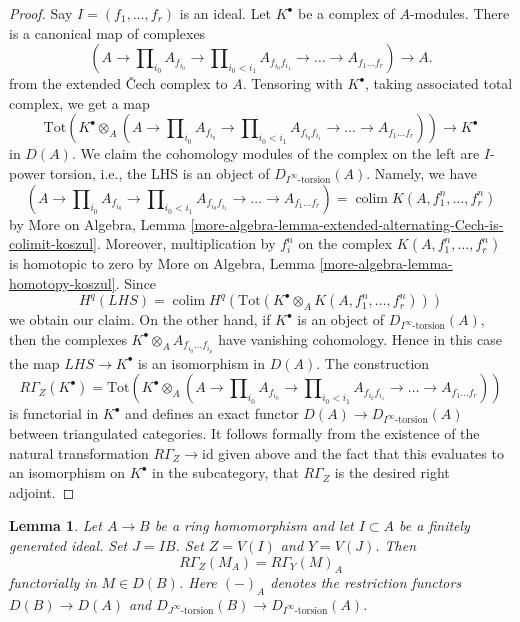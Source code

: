 \documentclass{stacks-project}
\theoremstyle{plain}
\newtheorem{lemma}[subsection]{Lemma}
\theoremstyle{definition}
\theoremstyle{remark}
\numberwithin{equation}{subsection}
\def\colim{\mathop{\mathrm{colim}}\nolimits}
\begin{document}
\begin{proof}
Say $I = (f_1, \ldots, f_r)$ is an ideal.
Let $K^\bullet$ be a complex of $A$-modules.
There is a canonical map of complexes
$$
(A \to \prod\nolimits_{i_0} A_{f_{i_0}} \to
\prod\nolimits_{i_0 < i_1} A_{f_{i_0}f_{i_1}} \to
\ldots \to A_{f_1\ldots f_r}) \longrightarrow A.
$$
from the extended {\v C}ech complex to $A$.
Tensoring with $K^\bullet$, taking associated total complex,
we get a map
$$
\text{Tot}\left(
K^\bullet \otimes_A
(A \to \prod\nolimits_{i_0} A_{f_{i_0}} \to
\prod\nolimits_{i_0 < i_1} A_{f_{i_0}f_{i_1}} \to
\ldots \to A_{f_1\ldots f_r})\right)
\longrightarrow
K^\bullet
$$
in $D(A)$. We claim the cohomology modules of the complex on the left are
$I$-power torsion, i.e., the LHS is an object of
$D_{I^\infty\text{-torsion}}(A)$. Namely, we have
$$
(A \to \prod\nolimits_{i_0} A_{f_{i_0}} \to
\prod\nolimits_{i_0 < i_1} A_{f_{i_0}f_{i_1}} \to
\ldots \to A_{f_1\ldots f_r}) = \colim K(A, f_1^n, \ldots, f_r^n)
$$
by More on Algebra, Lemma
\ref{more-algebra-lemma-extended-alternating-Cech-is-colimit-koszul}.
Moreover, multiplication by $f_i^n$ on the complex
$K(A, f_1^n, \ldots, f_r^n)$ is homotopic to zero by
More on Algebra, Lemma \ref{more-algebra-lemma-homotopy-koszul}.
Since
$$
H^q\left( LHS \right) =
\colim H^q(\text{Tot}(K^\bullet \otimes_A K(A, f_1^n, \ldots, f_r^n)))
$$
we obtain our claim. On the other hand, if $K^\bullet$ is an
object of $D_{I^\infty\text{-torsion}}(A)$, then the complexes
$K^\bullet \otimes_A A_{f_{i_0} \ldots f_{i_p}}$ have vanishing
cohomology. Hence in this case the map $LHS \to K^\bullet$
is an isomorphism in $D(A)$. The construction
$$
R\Gamma_Z(K^\bullet) =
\text{Tot}\left(
K^\bullet \otimes_A
(A \to \prod\nolimits_{i_0} A_{f_{i_0}} \to
\prod\nolimits_{i_0 < i_1} A_{f_{i_0}f_{i_1}} \to
\ldots \to A_{f_1\ldots f_r})\right)
$$
is functorial in $K^\bullet$ and defines an exact functor
$D(A) \to D_{I^\infty\text{-torsion}}(A)$ between
triangulated categories. It follows formally from the
existence of the natural transformation $R\Gamma_Z \to \text{id}$
given above and the fact that this evaluates to an isomorphism
on $K^\bullet$ in the subcategory, that $R\Gamma_Z$ is the desired
right adjoint.
\end{proof}

\begin{lemma}
\label{lemma-local-cohomology-and-restriction}
Let $A \to B$ be a ring homomorphism and let $I \subset A$
be a finitely generated ideal. Set $J = IB$. Set $Z = V(I)$
and $Y = V(J)$. Then
$$
R\Gamma_Z(M_A) = R\Gamma_Y(M)_A
$$
functorially in $M \in D(B)$. Here $(-)_A$ denotes the restriction
functors $D(B) \to D(A)$ and
$D_{J^\infty\text{-torsion}}(B) \to D_{I^\infty\text{-torsion}}(A)$.
\end{lemma}
\end{document}
